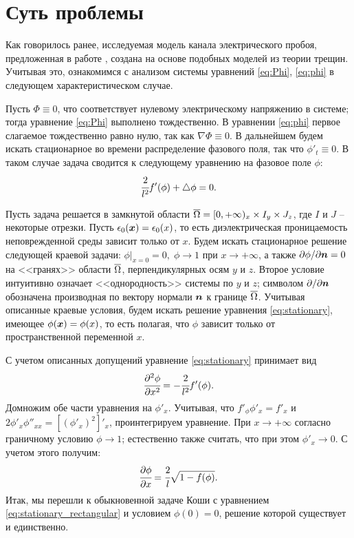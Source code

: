 
\section{Суть проблемы}

Как говорилось ранее, исследуемая модель канала электрического пробоя, предложенная в работе \cite{pitike_dielectric_breakdown}, создана на основе подобных моделей из теории трещин. Учитывая это, ознакомимся с анализом системы уравнений \eqref{eq:Phi}, \eqref{eq:phi} в следующем характеристическом случае.

Пусть $\Phi \equiv 0$, что соответствует нулевому электрическому напряжению в системе; тогда уравнение \eqref{eq:Phi} выполнено тождественно. В уравнении \eqref{eq:phi} первое слагаемое тождественно равно нулю, так как $\nabla \Phi \equiv 0$. В дальнейшем будем искать стационарное во времени распределение фазового поля, так что $\phi'_t \equiv 0$. В таком случае задача сводится к следующему уравнению на фазовое поле $\phi$:
\begin{equation}
    \cfrac{2}{l^2} f'(\phi) + \triangle \phi = 0 {\text{.}}
    \label{eq:stationary}
\end{equation}

Пусть задача решается в замкнутой области ${\overline{\Omega}} = [0, +\infty)_x \times I_y \times J_z$, где $I$ и $J$ -- некоторые отрезки. Пусть $\epsilon_0({\boldsymbol{x}}) = \epsilon_0(x)$, то есть диэлектрическая проницаемость неповрежденной среды зависит только от $x$. Будем искать стационарное решение следующей краевой задачи: $\phi|_{x = 0} = 0, \; \phi \to 1$ при $x \to +\infty$, а также $\partial \phi / \partial {\boldsymbol{n}} = 0$ на <<гранях>> области ${\overline{\Omega}}$, перпендикулярных осям $y$ и $z$. Второе условие интуитивно означает <<однородность>> системы по $y$ и $z$; символом $\partial  / \partial {\boldsymbol{n}}$ обозначена производная по вектору нормали ${\boldsymbol{n}}$ к границе ${\overline{\Omega}}$. Учитывая описанные краевые условия, будем искать решение уравнения \eqref{eq:stationary}, имеющее $\phi({\boldsymbol{x}}) = \phi(x)$, то есть полагая, что $\phi$ зависит только от пространственной переменной $x$.

С учетом описанных допущений уравнение \eqref{eq:stationary} принимает вид
$$\cfrac{\partial^2 \phi}{\partial x^2} = -\cfrac{2}{l^2} f'(\phi) {\text{.}}$$
Домножим обе части уравнения на $\phi'_x$. Учитывая, что $f'_\phi \phi'_x = f'_x$ и $2 \phi'_x \phi''_{xx} = [(\phi'_x)^2]'_x$, проинтегрируем уравнение. При $x \to +\infty$ согласно граничному условию $\phi \to 1$; естественно также считать, что при этом $\phi'_x \to 0$. С учетом этого получим:
\begin{equation}
    \cfrac{\partial \phi}{\partial x} = \cfrac{2}{l} \sqrt{1 - f(\phi)} {\text{.}}
    \label{eq:stationary_rectangular}
\end{equation}
Итак, мы перешли к обыкновенной задаче Коши с уравнением \eqref{eq:stationary_rectangular} и условием $\phi(0) = 0$, решение которой существует и единственно.


